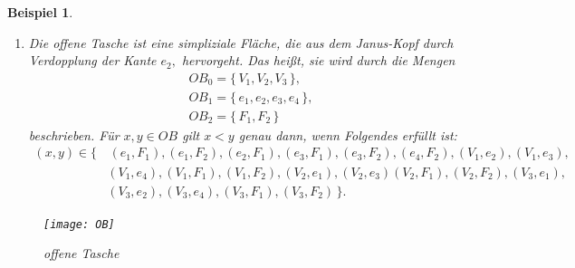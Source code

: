\documentclass[12pt,titlepage,twoside,cleardoublepage]{article}
\theoremstyle{nummermitklammern}
\newtheorem{bsp}[temp]{Beispiel}
\newtheorem{bsp}[zahl]{Beispiel}
\numberwithin{equation}{section}
\begin{document}
\begin{bsp}
\begin{enumerate}
 \begin{align*}
 &J_{0}=\{\,V_{1},V_{2},V_{3}\,\} ,\\
 &J_{1}=\{\,e_{1},e_{2},e_{3}\,\},\\
 &J_{2}=\{\, F_{1},F_{2}\,\}
\end{align*}
definiert. Für $x,y\in J$ gilt $x<y$ genau dann, wenn Folgendes erfüllt ist:
\begin{align*} 
 (x,y)\in\{&\,(e_{1},F_{1}),(e_{1},F_{2}),(e_{2},F_{1}),(e_{2},F_{2}),(e_{3},F_{1}),(e_{3},F_{2}),(V_{1},e_{2}),(V_{1},e_{3}),\\ &(V_{1},F_{1}),
  (V_{1},F_{2}),(V_{2},e_{1}),(V_{2},e_{3}),(V_{2},F_{1}),
 (V_{2},F_{2}), (V_{3},e_{1}), (V_{3},e_{2}),\\&(V_{3},F_{1}),(V_{3},F_{2}) \,\}.
 \end{align*}

\begin{figure}[H]
\begin{center}
\texttt{[image: JanusHead]}
\end{center}
\caption{Janus-Kopf}
\end{figure}
 \item 
 Die \emph{offene Tasche} ist eine simpliziale Fläche, die aus dem \emph{Janus-Kopf} durch Verdopplung der Kante $e_{2},$ hervorgeht. Das heißt, sie wird durch die Mengen
 \begin{align*}
&  OB_{0}=\{\,V_{1},V_{2},V_{3}\,\},\\
 & OB_{1}=\{\,e_{1},e_{2},e_{3},e_{4} \,\},\\
  &OB_{2}=\{\,F_{1},F_{2}\,\}
  \end{align*}
  beschrieben. Für  $x,y\in OB$ gilt $x<y$ genau dann, wenn Folgendes erfüllt ist:
   \begin{align*}
 (x,y)\in\{&\,(e_{1},F_{1}),(e_{1},F_{2}),(e_{2},F_{1}),(e_{3},F_{1}),(e_{3},F_{2}),(e_{4},F_{2}),(V_{1},e_{2}),(V_{1},e_{3}),\\ &(V_{1},e_{4}),
  (V_{1},F_{1}),(V_{1},F_{2}),(V_{2},e_{1}),(V_{2},e_{3})
 (V_{2},F_{1}), (V_{2},F_{2}), (V_{3},e_{1}),\\&(V_{3},e_{2}),(V_{3},e_{4}),(V_{3},F_{1}),(V_3,F_2) \,\}.
 \end{align*}
 \end{enumerate}
\begin{figure}[H]
\begin{center}
\texttt{[image: OB]}
\end{center}
\caption{offene Tasche}
\end{figure}
\end{bsp}
\end{document}
